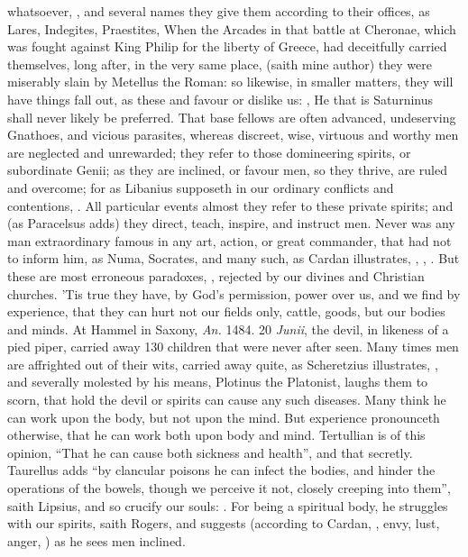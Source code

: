 whatsoever, , \etc{} and
several names they give them according to their offices, as Lares, Indegites,
Praestites, \etc{} When the Arcades in that battle at Cheronae, which was
fought against King Philip for the liberty of Greece, had deceitfully carried
themselves, long after, in the very same place, 
(saith mine author) they were miserably slain by Metellus the Roman: so
likewise, in smaller matters, they will have things fall out, as these
 and  favour or dislike us: , \etc{} He that is Saturninus shall never likely be preferred.
That base fellows are often advanced, undeserving
Gnathoes, and vicious parasites, whereas discreet, wise, virtuous and worthy
men are neglected and unrewarded; they refer to those domineering spirits, or
subordinate Genii; as they are inclined, or favour men, so they thrive, are
ruled and overcome; for as Libanius supposeth in our
ordinary conflicts and contentions, . All particular events almost they
refer to these private spirits; and (as Paracelsus adds) they direct, teach,
inspire, and instruct men. Never was any man extraordinary famous in any art,
action, or great commander, that had not  to inform
him, as Numa, Socrates, and many such, as Cardan illustrates,
, ,
. But these are most
erroneous paradoxes, , rejected by our divines
and Christian churches. 'Tis true they have, by God's permission, power over
us, and we find by experience, that they can hurt not our
fields only, cattle, goods, but our bodies and minds. At Hammel in Saxony,
\emph{An.} 1484. 20 \emph{Junii}, the devil, in likeness of a pied piper,
carried away 130 children that were never after seen. Many times men are
affrighted out of their wits, carried away quite, as
Scheretzius illustrates, , and severally
molested by his means, Plotinus the Platonist,  laughs them to scorn, that hold the devil or spirits can cause
any such diseases. Many think he can work upon the body, but not upon the mind.
But experience pronounceth otherwise, that he can work both upon body and mind.
Tertullian is of this opinion, 
\enquote{That he can cause both sickness and health}, and that
secretly. Taurellus adds \enquote{by clancular poisons he can
infect the bodies, and hinder the operations of the bowels, though we perceive
it not, closely creeping into them}, saith Lipsius, and so
crucify our souls: . For being a
spiritual body, he struggles with our spirits, saith Rogers, and suggests
(according to Cardan, , envy, lust, anger, \etc{}) as he sees men inclined.

